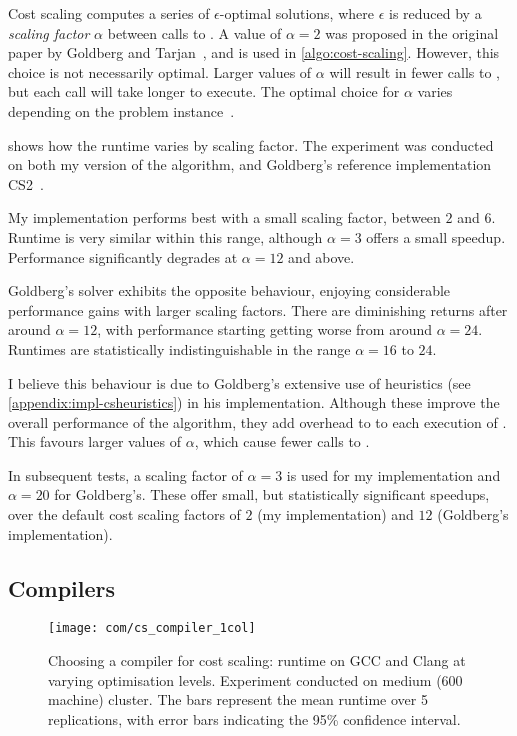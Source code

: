 Cost scaling computes a series of $\epsilon$-optimal solutions, where $\epsilon$ is reduced by a \emph{scaling factor} $\alpha$ between calls to . A value of $\alpha=2$ was proposed in the original paper by Goldberg and Tarjan~\cite{Goldberg:1987}, and is used in \cref{algo:cost-scaling}. However, this choice is not necessarily optimal. Larger values of $\alpha$ will result in fewer calls to , but each call will take longer to execute. The optimal choice for $\alpha$ varies depending on the problem instance~\cite[\S7]{Goldberg:1997}.

 shows how the runtime varies by scaling factor. %
The experiment was conducted on both my version of the algorithm, and Goldberg's reference implementation CS2~\cite{CS2:2009}.

My implementation performs best with a small scaling factor, between $2$ and $6$. Runtime is very similar within this range, although $\alpha=3$ offers a small speedup. Performance significantly degrades at $\alpha = 12$ and above.

Goldberg's solver exhibits the opposite behaviour, enjoying considerable performance gains with larger scaling factors. There are diminishing returns after around $\alpha = 12$, with performance starting getting worse from around $\alpha = 24$. Runtimes are statistically indistinguishable in the range $\alpha=16$ to $24$.

I believe this behaviour is due to Goldberg's extensive use of heuristics (see \cref{appendix:impl-csheuristics}) in his implementation. Although these improve the overall performance of the algorithm, they add overhead to to each execution of . This favours larger values of $\alpha$, which cause fewer calls to . 

In subsequent tests, a scaling factor of $\alpha = 3$ is used for my implementation and $\alpha = 20$ for Goldberg's. These offer small, but statistically significant speedups, over the default cost scaling factors of $2$ (my implementation) and $12$ (Goldberg's implementation).

\subsection{Compilers} \label{sec:eval-optimisations-compilers}

\begin{figure}
    \texttt{[image: com/cs\_compiler\_1col]}
    \caption[Choosing a compiler for cost scaling]{Choosing a compiler for cost scaling: runtime on GCC and Clang at varying optimisation levels. Experiment conducted on medium (600 machine) cluster. The bars represent the mean runtime over 5 replications, with error bars indicating the 95\% confidence interval.}
    \label{fig:compiler-settings}
\end{figure}

